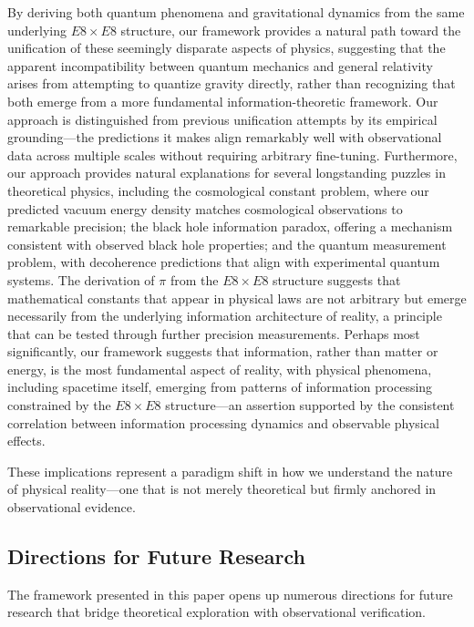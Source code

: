 \documentclass[11pt,english,twoside]{article}
\begin{document}
By deriving both quantum phenomena and gravitational dynamics from the same underlying $E8\times E8$ structure, our framework provides a natural path toward the unification of these seemingly disparate aspects of physics, suggesting that the apparent incompatibility between quantum mechanics and general relativity arises from attempting to quantize gravity directly, rather than recognizing that both emerge from a more fundamental information-theoretic framework. Our approach is distinguished from previous unification attempts by its empirical grounding—the predictions it makes align remarkably well with observational data across multiple scales without requiring arbitrary fine-tuning. Furthermore, our approach provides natural explanations for several longstanding puzzles in theoretical physics, including the cosmological constant problem, where our predicted vacuum energy density matches cosmological observations to remarkable precision; the black hole information paradox, offering a mechanism consistent with observed black hole properties; and the quantum measurement problem, with decoherence predictions that align with experimental quantum systems. The derivation of $\pi$ from the $E8\times E8$ structure suggests that mathematical constants that appear in physical laws are not arbitrary but emerge necessarily from the underlying information architecture of reality, a principle that can be tested through further precision measurements. Perhaps most significantly, our framework suggests that information, rather than matter or energy, is the most fundamental aspect of reality, with physical phenomena, including spacetime itself, emerging from patterns of information processing constrained by the $E8\times E8$ structure—an assertion supported by the consistent correlation between information processing dynamics and observable physical effects.

These implications represent a paradigm shift in how we understand the nature of physical reality—one that is not merely theoretical but firmly anchored in observational evidence.

\subsection{Directions for Future Research}

The framework presented in this paper opens up numerous directions for future research that bridge theoretical exploration with observational verification.
\end{document}
